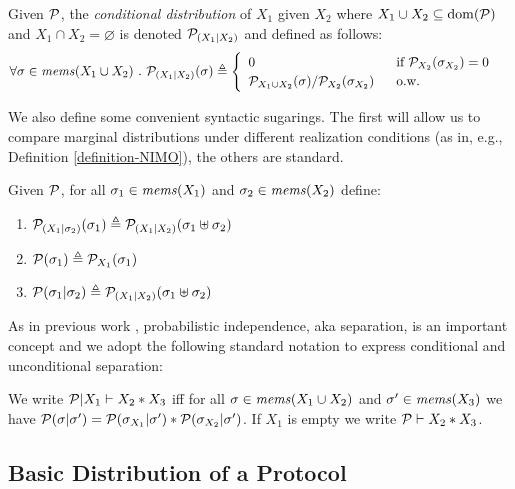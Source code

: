 \begin{definition}
  Given $\mathcal{P}$, the \emph{conditional distribution}
  of $X_1$ given $X_2$ where $X_1 \cup X_2 \subseteq \mathrm{dom}(\mathcal{P})$ and $X_1 \cap X_2 = \varnothing$
  is denoted $\mathcal{P}_{({X_1}|{X_2})}$ and defined as follows:
  $$
  \forall \store \in \mems(X_1 \cup X_2)\ .\ 
  \condd{\pmf}{X_1}{X_2}(\store) \defeq
  \begin{cases}
    \begin{array}{ll}
      0 & \text{\ if\ } \margd{\pmf}{X_2}(\store_{X_2}) = 0\\
      \margd{\pmf}{X_1 \cup X_2}(\store) / \margd{\pmf}{X_2}(\store_{X_2})\ & \text{\ o.w.}
     \end{array}
  \end{cases}
  $$
\end{definition}
We also define some convenient syntactic sugarings. The first will allow us to
compare marginal distributions under different realization conditions
(as in, e.g., Definition \ref{definition-NIMO}), the others are standard.
\begin{definition}
  Given $\mathcal{P}$, for all $\sigma_1 \in \mathit{mems}(X_1)$ and $\sigma_2 \in \mathit{mems}(X_2)$ define:
  \begin{enumerate}
  \item $\mathcal{P}_{({X_1}|{\sigma_2})}(\sigma_1) \triangleq \mathcal{P}_{({X_1}|{X_2})}(\sigma_1 \uplus \sigma_2)$
  \item $\mathcal{P}(\sigma_1)  \triangleq {\mathcal{P}}_{X_1}(\sigma_1)$ 
  \item $\mathcal{P}(\sigma_1|\sigma_2) \triangleq \mathcal{P}_{({X_1}|{X_2})}(\sigma_1 \uplus \sigma_2)$
  \end{enumerate}
\end{definition}
As in previous work \cite{darais2019language,barthe2019probabilistic,skalka-near-ppdp24,li2023lilac}, 
probabilistic independence, aka separation, is an important concept and we adopt the
following standard notation to express conditional and unconditional separation:
\begin{definition}
  We write $\mathcal{P}|X_1 \vdash X_2 * X_3$ iff for all
    $\sigma \in \mathit{mems}(X_1 \cup X_2)$ and $\sigma' \in \mathit{mems}(X_3)$ we have
  $\mathcal{P}(\sigma|\sigma') =
  \mathcal{P}(\sigma_{X_1}|\sigma') * \mathcal{P}(\sigma_{X_2}|\sigma')$. If $X_1$ is empty
  we write $\mathcal{P} \vdash X_2 * X_3$.
\end{definition}

\subsection{Basic Distribution of a Protocol}

